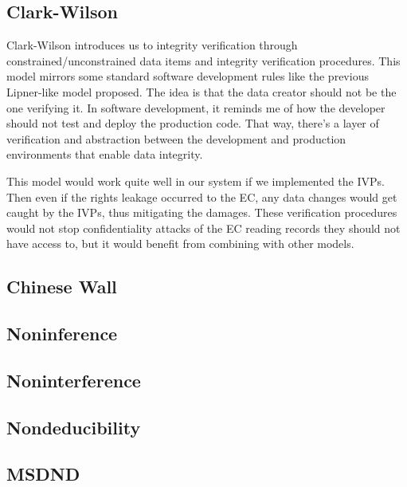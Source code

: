 \documentclass[10pt,journal,compsoc]{IEEEtran}
\begin{document}
\subsection{Clark-Wilson}

Clark-Wilson introduces us to integrity verification through constrained/unconstrained data items and integrity verification procedures. This model mirrors some standard software development rules like the previous Lipner-like model proposed. The idea is that the data creator should not be the one verifying it. In software development, it reminds me of how the developer should not test and deploy the production code. That way, there's a layer of verification and abstraction between the development and production environments that enable data integrity.

This model would work quite well in our system if we implemented the IVPs. Then even if the rights leakage occurred to the EC, any data changes would get caught by the IVPs, thus mitigating the damages. These verification procedures would not stop confidentiality attacks of the EC reading records they should not have access to, but it would benefit from combining with other models. 

\subsection{Chinese Wall}

\subsection{Noninference}

\subsection{Noninterference}

\subsection{Nondeducibility}

\subsection{MSDND}


\ifCLASSOPTIONcaptionsoff
  \newpage
\fi
\end{document}
